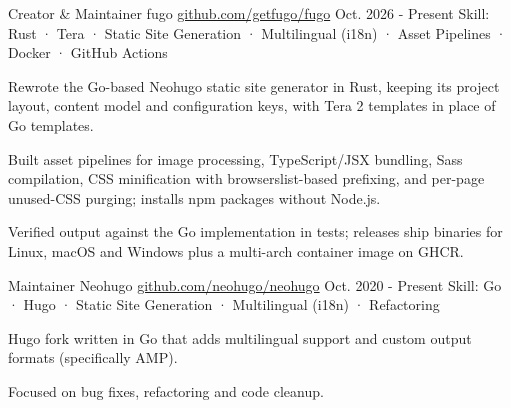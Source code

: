 

\begin{cventries}

  \cventry
    {Creator \& Maintainer} %
    {fugo} %
    {\href{https://github.com/getfugo/fugo}{github.com/getfugo/fugo}} %
    {Oct. 2026 - Present} %
    {Skill: Rust · Tera · Static Site Generation · Multilingual (i18n) · Asset Pipelines · Docker · GitHub Actions} %
    {
      \begin{cvitems} %
        \item {Rewrote the Go-based Neohugo static site generator in Rust, keeping its project layout, content model and configuration keys, with Tera 2 templates in place of Go templates.}
        \item {Built asset pipelines for image processing, TypeScript/JSX bundling, Sass compilation, CSS minification with browserslist-based prefixing, and per-page unused-CSS purging; installs npm packages without Node.js.}
        \item {Verified output against the Go implementation in tests; releases ship binaries for Linux, macOS and Windows plus a multi-arch container image on GHCR.}
      \end{cvitems}
    }

  \cventry
    {Maintainer} %
    {Neohugo} %
    {\href{https://github.com/neohugo/neohugo}{github.com/neohugo/neohugo}} %
    {Oct. 2020 - Present} %
    {Skill: Go · Hugo · Static Site Generation · Multilingual (i18n) · Refactoring} %
    {
      \begin{cvitems} %
        \item {Hugo fork written in Go that adds multilingual support and custom output formats (specifically AMP).}
        \item {Focused on bug fixes, refactoring and code cleanup.}
      \end{cvitems}
    }

\end{cventries}

